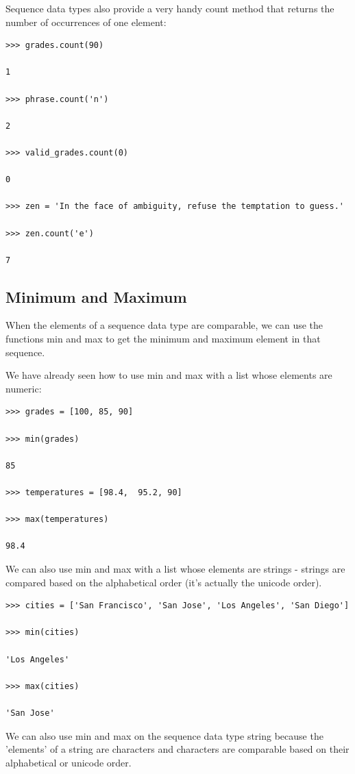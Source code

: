 \documentclass{article}
\begin{document}
Sequence data types also provide a very handy count method that returns the number of occurrences of one element:

\begin{lstlisting}
>>> grades.count(90)

1

>>> phrase.count('n')

2

>>> valid_grades.count(0)

0

>>> zen = 'In the face of ambiguity, refuse the temptation to guess.'

>>> zen.count('e')

7
\end{lstlisting}

\subsection{Minimum and Maximum}

When the elements of a sequence data type are comparable, we can use the functions min and max to get the minimum and maximum element in that sequence.

We have already seen how to use min and max with a list whose elements are numeric:

\begin{lstlisting}
>>> grades = [100, 85, 90]

>>> min(grades)

85

>>> temperatures = [98.4,  95.2, 90]

>>> max(temperatures)

98.4
\end{lstlisting}

We can also use min and max with a list whose elements are strings - strings are compared based on the alphabetical order (it's actually the unicode order).

\begin{lstlisting}
>>> cities = ['San Francisco', 'San Jose', 'Los Angeles', 'San Diego']

>>> min(cities)

'Los Angeles'

>>> max(cities)

'San Jose' 
\end{lstlisting}

We can also use min and max on the sequence data type string because the 'elements' of a string are characters and characters are comparable based on their alphabetical or unicode order.
\end{document}

